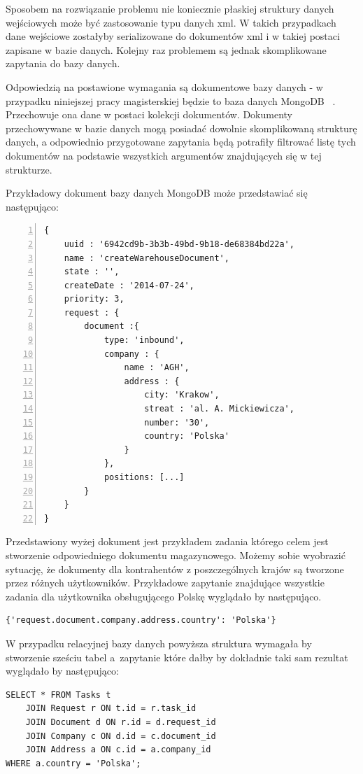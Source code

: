 Sposobem na rozwiązanie problemu nie koniecznie płaskiej struktury danych wejściowych może być zastosowanie typu danych xml. W takich przypadkach dane wejściowe zostałyby serializowane do dokumentów xml i w takiej postaci zapisane w bazie danych. Kolejny raz problemem są jednak skomplikowane zapytania do bazy danych. 

Odpowiedzią na postawione wymagania są dokumentowe bazy danych - w przypadku niniejszej pracy magisterskiej będzie to baza danych MongoDB ~\cite{mongodb}. Przechowuje ona dane w postaci kolekcji dokumentów. Dokumenty przechowywane w bazie danych mogą posiadać dowolnie skomplikowaną strukturę danych, a odpowiednio przygotowane zapytania będą potrafiły filtrować listę tych dokumentów na podstawie wszystkich argumentów znajdujących się w tej strukturze. 

Przykładowy dokument bazy danych MongoDB może przedstawiać się następująco:

\begin{lstlisting}[caption=Zadanie w postaci dokumentu MongoDB.,numbers=left]
{	
	uuid : '6942cd9b-3b3b-49bd-9b18-de68384bd22a',
	name : 'createWarehouseDocument',
	state : '',
	createDate : '2014-07-24',
	priority: 3,
	request : {
		document :{
			type: 'inbound',
			company : {
				name : 'AGH',
				address : {
					city: 'Krakow',
					streat : 'al. A. Mickiewicza',
					number: '30',
					country: 'Polska'
				}
			},
			positions: [...]
		}
	}
}
\end{lstlisting}


Przedstawiony wyżej dokument jest przykładem zadania którego celem jest stworzenie odpowiedniego dokumentu magazynowego. Możemy sobie wyobrazić sytuację, że dokumenty dla kontrahentów z poszczególnych krajów są tworzone przez różnych użytkowników. Przykładowe zapytanie znajdujące wszystkie zadania dla użytkownika obsługującego Polskę wyglądało by następująco. 

\begin{lstlisting}[caption=Zapytanie MongoDB.]
{'request.document.company.address.country': 'Polska'}
\end{lstlisting}

W przypadku relacyjnej bazy danych powyższa struktura wymagała by stworzenie sześciu tabel a~zapytanie które dałby by dokładnie taki sam rezultat wyglądało by następująco:

\begin{lstlisting}[caption=Zapytanie SQL.]
SELECT * FROM Tasks t 
	JOIN Request r ON t.id = r.task_id
	JOIN Document d ON r.id = d.request_id
	JOIN Company c ON d.id = c.document_id
	JOIN Address a ON c.id = a.company_id
WHERE a.country = 'Polska';
\end{lstlisting}

